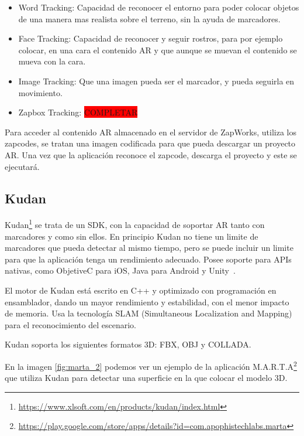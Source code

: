 \begin{itemize}
	\item Word Tracking: Capacidad de reconocer el entorno para poder colocar objetos de una manera mas realista sobre el terreno, sin la ayuda de marcadores.
	\item Face Tracking: Capacidad de reconocer y seguir rostros, para por ejemplo colocar, en una cara el contenido AR y que aunque se muevan el contenido se mueva con la cara.
	\item Image Tracking: Que una imagen pueda ser el marcador, y pueda seguirla en movimiento.
	\item Zapbox Tracking: \colorbox{red}{COMPLETAR}	 
\end{itemize}

Para acceder al contenido AR almacenado en el servidor de ZapWorks, utiliza los zapcodes, se tratan una imagen codificada para que pueda descargar un proyecto AR. Una vez que la aplicación reconoce el zapcode, descarga el proyecto y este se ejecutará.



\subsection{Kudan} 

Kudan\footnote{\url{https://www.xlsoft.com/en/products/kudan/index.html}} 
se trata de un SDK, con la capacidad de soportar AR tanto con marcadores y como sin ellos. En principio Kudan no tiene un limite de marcadores que pueda detectar al mismo tiempo, pero se puede incluir un limite para que la aplicación tenga un rendimiento adecuado. 
Posee soporte para APIs nativas, como ObjetiveC para iOS, Java para Android y Unity~\cite{kudan_developer_hub}.

El motor de Kudan está escrito en C++ y optimizado con programación en ensamblador, dando un mayor rendimiento y estabilidad, con el menor impacto de memoria.
Usa la tecnología SLAM (Simultaneous Localization and Mapping) para el reconocimiento del escenario.


Kudan soporta los siguientes formatos 3D: FBX, OBJ y COLLADA.

En la imagen \ref{fig:marta_2} podemos ver un ejemplo de la aplicación M.A.R.T.A\footnote{\url{https://play.google.com/store/apps/details?id=com.apophistechlabs.marta}} que utiliza Kudan para detectar una superficie en la que colocar el modelo 3D.


